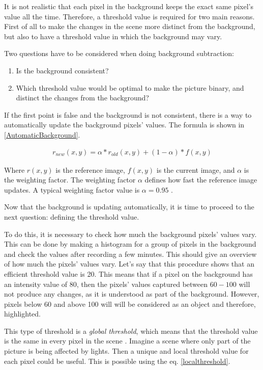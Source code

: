 {It is not realistic that each pixel in the background keeps the exact same pixel's value all the time. Therefore, a threshold value is required for two main reasons. First of all to make the changes in the scene more distinct from the background, but also to have a threshold value in which the background may vary.

Two questions have to be considered when doing background subtraction:
\begin{enumerate} 
	\item Is the background consistent? 
	\item Which threshold value would be optimal to make the picture binary, and distinct the changes from the background? 
\end{enumerate}

If the first point is false and the background is not consistent, there is a way to automatically update the background pixels' values. The formula is shown in \ref{AutomaticBackground}.

\begin{equation}
	\begin{aligned}
  		r_{new}(x,y)=\alpha*r_{old}(x,y)+(1-\alpha)*f(x,y)
		\label{AutomaticBackground}  
 	\end{aligned}
\end{equation}  

Where $r(x,y)$ is the reference image, $f(x,y)$ is the current image, and $\alpha$ is the weighting factor. The weighting factor $\alpha$ defines how fast the reference image updates. A typical weighting factor value is  $\alpha = 0.95$ \citep{ip_book}.

Now that the background is updating automatically, it is time to proceed to the next question: defining the threshold value.

To do this, it is necessary to check how much the background pixels' values vary. This can be done by making a histogram for a group of pixels in the background and check the values after recording a few minutes. This should give an overview of how much the pixels' values vary. Let's say that this procedure shows that an efficient threshold value is 20. This means that if a pixel on the background has an intensity value of 80, then the pixels' values captured between $60-100$ will not produce any changes, as it is understood as part of the background. However, pixels below 60 and above 100 will will be considered as an object and therefore, highlighted.

This type of threshold is a \textit{global threshold}, which means that the threshold value is the same in every pixel in the scene \citep{ip_book}. Imagine a scene where only part of the picture is being affected by lights. Then a unique and local threshold value for each pixel could be useful. This is possible using the eq. \ref{localthreshold}.

}
